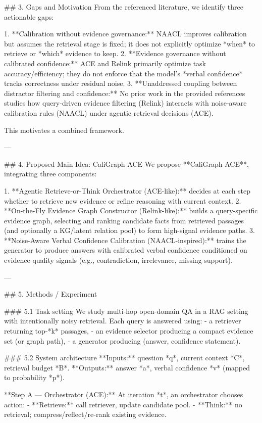 ## 3. Gaps and Motivation  
From the referenced literature, we identify three actionable gaps:

1. **Calibration without evidence governance:** NAACL improves calibration but assumes the retrieval stage is fixed; it does not explicitly optimize *when* to retrieve or *which* evidence to keep.  
2. **Evidence governance without calibrated confidence:** ACE and Relink primarily optimize task accuracy/efficiency; they do not enforce that the model’s *verbal confidence* tracks correctness under residual noise.  
3. **Unaddressed coupling between distractor filtering and confidence:** No prior work in the provided references studies how query-driven evidence filtering (Relink) interacts with noise-aware calibration rules (NAACL) under agentic retrieval decisions (ACE).

This motivates a combined framework.

---

## 4. Proposed Main Idea: CaliGraph-ACE  
We propose **CaliGraph-ACE**, integrating three components:

1. **Agentic Retrieve-or-Think Orchestrator (ACE-like):** decides at each step whether to retrieve new evidence or refine reasoning with current context.  
2. **On-the-Fly Evidence Graph Constructor (Relink-like):** builds a query-specific evidence graph, selecting and ranking candidate facts from retrieved passages (and optionally a KG/latent relation pool) to form high-signal evidence paths.  
3. **Noise-Aware Verbal Confidence Calibration (NAACL-inspired):** trains the generator to produce answers with calibrated verbal confidence conditioned on evidence quality signals (e.g., contradiction, irrelevance, missing support).

---

## 5. Methods / Experiment  

### 5.1 Task setting  
We study multi-hop open-domain QA in a RAG setting with intentionally noisy retrieval. Each query is answered using:
- a retriever returning top-*k* passages,
- an evidence selector producing a compact evidence set (or graph path),
- a generator producing (answer, confidence statement).

### 5.2 System architecture  
**Inputs:** question *q*, current context *C*, retrieval budget *B*.  
**Outputs:** answer *a*, verbal confidence *v* (mapped to probability *p*).

**Step A — Orchestrator (ACE):**  
At iteration *t*, an orchestrator chooses action:
- **Retrieve:** call retriever, update candidate pool.
- **Think:** no retrieval; compress/reflect/re-rank existing evidence.

